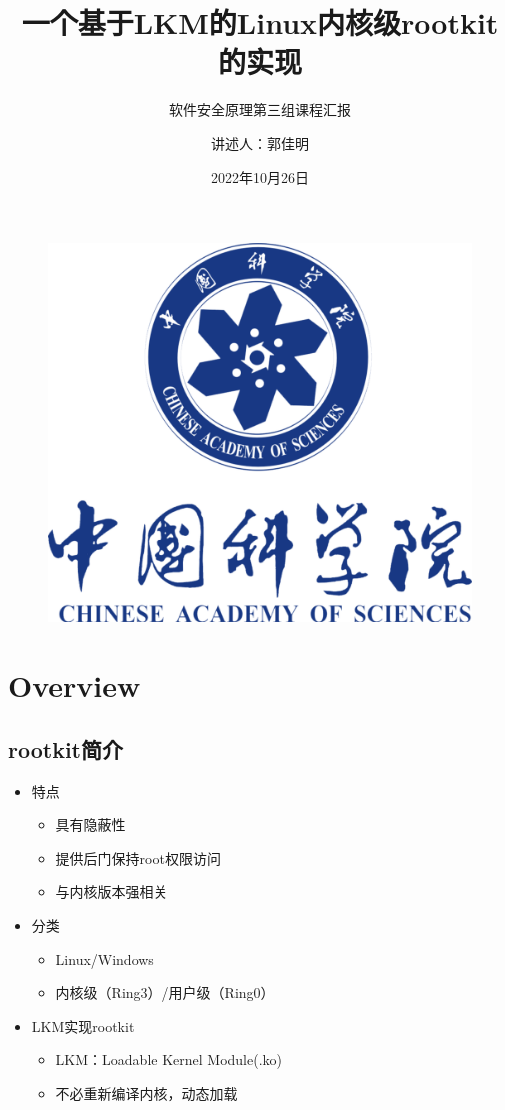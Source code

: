 \documentclass[11pt]{beamer}
\author{讲述人：郭佳明}
\title{ 一个基于LKM的Linux内核级rootkit的实现 }
\subtitle{软件安全原理第三组课程汇报}
\institute{中国科学院信息工程研究所}
\date{2022年10月26日}
\begin{document}
\kaishu
\begin{frame}
    \titlepage
    \begin{figure}[htpb]
        \begin{center}
            \includegraphics[width=0.2\linewidth]{pic/cas_logo.png}
        \end{center}
    \end{figure}
\end{frame}






\begin{frame}%
    \tableofcontents[sectionstyle=show,subsectionstyle=show/shaded/hide,subsubsectionstyle=show/shaded/hide]
\end{frame}





\section{Overview}
\subsection{rootkit简介}
\begin{frame}
    \begin{itemize}
        \item 特点
        \begin{itemize}
        	\item 具有隐蔽性
        	\item 提供后门保持root权限访问
        	\item 与内核版本强相关
        \end{itemize}
        \item 分类
        \begin{itemize}
        	\item Linux/Windows
        	\item 内核级（Ring3）/用户级（Ring0）
        \end{itemize}
        \item LKM实现rootkit
        \begin{itemize}
            \item LKM：Loadable Kernel Module(.ko)
            \item 不必重新编译内核，动态加载
        \end{itemize}
    \end{itemize}
\end{frame}
\end{document}
